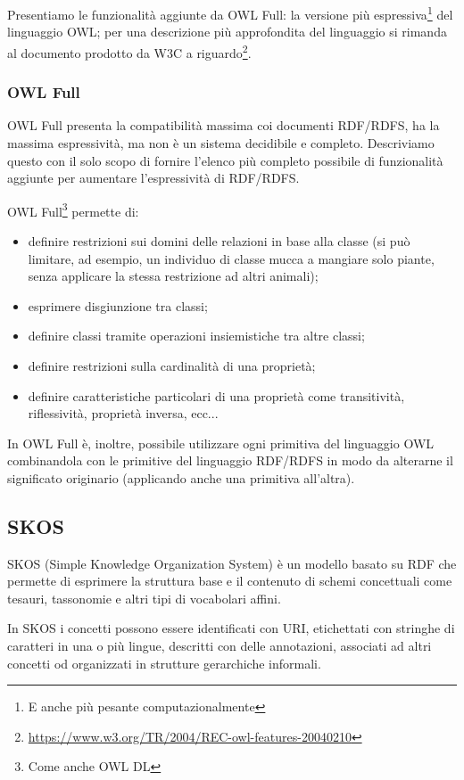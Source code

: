 Presentiamo le funzionalità aggiunte da OWL Full: la versione più espressiva\footnote{E anche più pesante computazionalmente} del linguaggio OWL; per una descrizione più approfondita del linguaggio si rimanda al documento prodotto da W3C a riguardo\footnote{\url{https://www.w3.org/TR/2004/REC-owl-features-20040210}}.
\subsubsection{OWL Full}
OWL Full presenta la compatibilità massima coi documenti RDF/RDFS, ha la massima espressività, ma non è un sistema decidibile e completo. Descriviamo questo con il solo scopo di fornire l'elenco più completo possibile di funzionalità aggiunte per aumentare l'espressività di RDF/RDFS.

OWL Full\footnote{Come anche OWL DL\cite{antoniou2009web}} permette di:
\begin{itemize}
	\item definire restrizioni sui domini delle relazioni in base alla classe (si può limitare, ad esempio, un individuo di classe mucca a mangiare solo piante, senza applicare la stessa restrizione ad altri animali);
	\item esprimere disgiunzione tra classi;
	\item definire classi tramite operazioni insiemistiche tra altre classi;
	\item definire restrizioni sulla cardinalità di una proprietà;
	\item definire caratteristiche particolari di una proprietà come transitività, riflessività, proprietà inversa, ecc...
\end{itemize}

In OWL Full è, inoltre, possibile utilizzare ogni primitiva del linguaggio OWL combinandola con le primitive del linguaggio RDF/RDFS in modo da alterarne il significato originario (applicando anche una primitiva all'altra).
\subsection{SKOS}
SKOS (Simple Knowledge Organization System) è un modello basato su RDF che permette di esprimere la struttura base e il contenuto di schemi concettuali come tesauri, tassonomie e altri tipi di vocabolari affini\cite{isaac2009skos}.

In SKOS i concetti possono essere identificati con URI, etichettati con stringhe di caratteri in una o più lingue, descritti con delle annotazioni, associati ad altri concetti od organizzati in strutture gerarchiche informali\cite{miles2009skos}.

